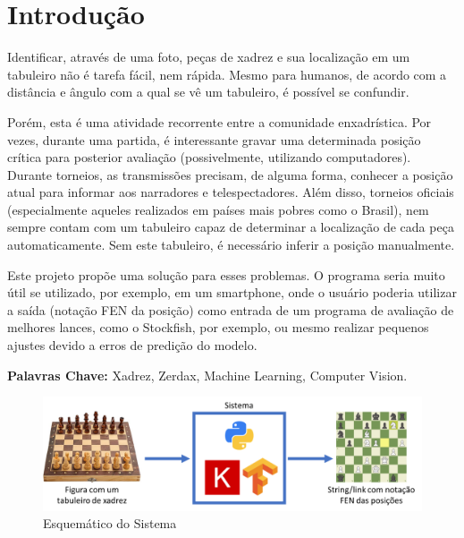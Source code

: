 \documentclass[a4paper,12pt,twoside]{article}
\begin{document}
\pagestyle{plain}
\section{Introdução} %
Identificar, através de uma foto,
peças de xadrez e sua localização em um tabuleiro não é tarefa fácil, nem rápida.
Mesmo para humanos, de acordo com a distância e ângulo com a qual se vê um tabuleiro,
é possível se confundir.

Porém, esta é uma atividade recorrente entre a comunidade enxadrística.
Por vezes, durante uma partida,
é interessante gravar uma determinada posição crítica para posterior avaliação
(possivelmente, utilizando computadores).
Durante torneios, as transmissões precisam, de alguma forma,
conhecer a posição atual para informar aos narradores e telespectadores.
Além disso, torneios oficiais (especialmente aqueles realizados em países mais pobres como o Brasil),
nem sempre contam com um tabuleiro capaz de determinar a localização de cada peça automaticamente.
Sem este tabuleiro, é necessário inferir a posição manualmente.

Este projeto propõe uma solução para esses problemas.
O programa seria muito útil se utilizado, por exemplo, em um smartphone,
onde o usuário poderia utilizar a saída
(notação FEN da posição) como entrada de um programa de avaliação de melhores lances,
como o Stockfish, por exemplo, ou mesmo realizar pequenos ajustes devido a erros de predição do modelo.

\vspace{0.3in}
\setlength{\parindent}{0in}
\textbf{Palavras Chave:} Xadrez, Zerdax, Machine Learning, Computer Vision.

\setlength{\parindent}{0.4in}

\begin{figure}[h!]
    \centering
    \includegraphics[width=\linewidth]{fig/sistema.png}
    \caption{Esquemático do Sistema}
    \label{fig:sistema}
\end{figure}

\vspace{0.5in}
\newpage
\end{document}
